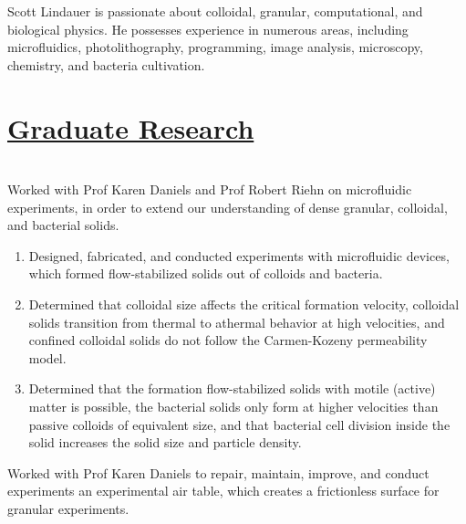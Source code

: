\documentclass[]{deedy-resume-openfont}
\begin{document}
\hfill
\vline
\hfill
\begin{minipage}[t]{0.720\textwidth} 

\vspace{5pt}
Scott Lindauer is passionate about colloidal, granular, computational, and biological physics. He possesses experience in numerous areas, including microfluidics, photolithography, programming, image analysis, microscopy, chemistry, and bacteria cultivation.



\section{\underline{Graduate Research}}
 \\
Worked with Prof Karen Daniels and Prof Robert Riehn on microfluidic experiments, in order to extend our understanding of dense granular, colloidal, and bacterial solids.

\begin{enumerate}[label=\textbullet,leftmargin = !,labelindent = -15pt, itemindent = 0pt, noitemsep, topsep = 0pt]

\item Designed, fabricated, and conducted experiments with microfluidic devices, which formed flow-stabilized solids out of colloids and bacteria. 

\item Determined that colloidal size affects the critical formation velocity, colloidal solids transition from thermal to athermal behavior at high velocities, and confined colloidal solids do not follow the Carmen-Kozeny permeability model.

\item Determined that the formation flow-stabilized solids with motile (active) matter is possible, the bacterial solids only form at higher velocities than passive colloids of equivalent size, and that bacterial cell division inside the solid increases the solid size and particle density.

\end{enumerate}

\vspace{5pt}

Worked with Prof Karen Daniels to repair, maintain, improve, and conduct experiments an experimental air table, which creates a frictionless surface for granular experiments. 


\end{minipage}
\end{document}
